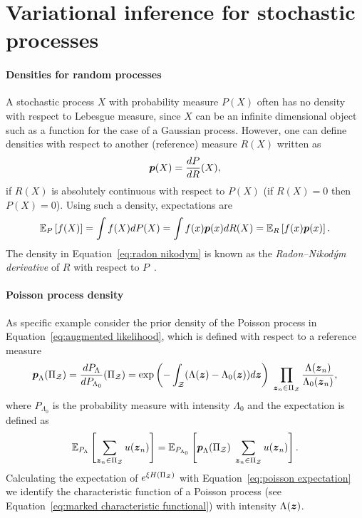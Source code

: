 \section{Variational inference for stochastic processes}\label{app:variational inference}
\paragraph{Densities for random processes}
A stochastic process $X$  with probability measure $P(X)$ often has no 
density with respect to Lebesgue measure, since $X$ can be an infinite dimensional object
such as a function for the case of a Gaussian process. However, one can define densities 
with respect to another (reference) measure $R(X)$ written as
\begin{equation}\label{eq:radon nikodym}
\boldsymbol{p}(X) = \frac{dP}{dR}(X),
\end{equation}
if $R(X)$ is absolutely continuous with respect to $P(X)$ (if $R(X)=0$ then $P(X)=0$).  
Using such a density, expectations are
\begin{equation}
\mathbb{E}_{P}\left[ f(X) \right] = \int f(X)dP(X) = \int f(x)\boldsymbol{p}(x)dR(X) = \mathbb{E}_{R}\left[ f(x)\boldsymbol{p}(x) \right].
\end{equation}
The density in Equation~\eqref{eq:radon nikodym} is known as the {\it Radon--Nikod\'ym derivative} of $R$ with respect to $P$~\citep{konstantopoulos2011radon}. 
\paragraph{Poisson process density} As specific example consider the prior density of the Poisson process in Equation~\eqref{eq:augmented likelihood}, which is defined with respect to a reference measure
\begin{equation}
\boldsymbol{p}_{\Lambda}(\Pi_{\mathcal{Z}}) = \frac{dP_\Lambda}{dP_{\Lambda_0}}(\Pi_{\mathcal{Z}}) = \exp\left(-\int_{\mathcal{Z}}(\Lambda(\boldsymbol{z}) - \Lambda_0(\boldsymbol{z}))d\boldsymbol{z}\right)\; \prod_{\boldsymbol{z}_n \in \Pi_{\mathcal{Z}}} \frac{\Lambda(\boldsymbol{z}_n)}{\Lambda_0(\boldsymbol{z}_n)},
\end{equation}
where $P_{\Lambda_0}$ is the probability measure with intensity $\Lambda_0$ and the expectation is defined as 
\begin{equation}\label{eq:poisson expectation}
\mathbb{E}_{P_\Lambda}\left[ \sum_{\boldsymbol{z}_n\in \Pi_{\mathcal{Z}}} u(\boldsymbol{z}_n) \right] = \mathbb{E}_{P_{\Lambda_0}}\left[ \boldsymbol{p}_{\Lambda}(\Pi_{\mathcal{Z}})\; \sum_{\boldsymbol{z}_n\in \Pi_{\mathcal{Z}}} u(\boldsymbol{z}_n) \right].
\end{equation}
Calculating the expectation of $e^{\xi H(\Pi_{\mathcal{Z}})}$ with Equation~\eqref{eq:poisson expectation} we identify the characteristic function of a Poisson process (see Equation~\eqref{eq:marked characteristic functional}) with intensity $\Lambda(\boldsymbol{z})$.
